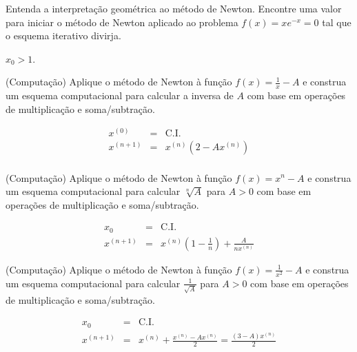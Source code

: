 \begin{exer} Entenda a interpretação geométrica ao método de Newton. Encontre uma valor para iniciar o método de Newton aplicado ao problema $f(x)=xe^{-x}=0$ tal que o esquema iterativo divirja.
\end{exer}
\begin{resp}
  
$x_0>1$.    
  
\end{resp}

\begin{exer}(Computação) Aplique o método de Newton à função $f(x)=\frac{1}{x}-A$ e construa um esquema computacional para calcular a inversa de $A$ com base em operações de multiplicação e soma/subtração.
 \end{exer}
\begin{resp}
  \begin{eqnarray*}
 x^{(0)} &=& \text{C.I.}\\
 x^{(n+1)}&=&x^{(n)}\left(2-Ax^{(n)}\right) \\ 
 \end{eqnarray*}
\end{resp}


\begin{exer}(Computação) Aplique o método de Newton à função $f(x)=x^n-A$ e construa um esquema computacional para calcular  $\sqrt[n]{A}$ para $A>0$ com base em operações de multiplicação e soma/subtração.
\end{exer}
\begin{resp}
 \begin{eqnarray*}
 x_{0} &=& \text{C.I.}\\
 x^{(n+1)}&=&x^{(n)}\left(1-\frac{1}{n}\right) + \frac{A}{n x^{(n)}}
 \end{eqnarray*}

\end{resp}


\begin{exer}(Computação) Aplique o método de Newton à função $f(x)=\frac{1}{x^2}-A$ e construa um esquema computacional para calcular  $\frac{1}{\sqrt{A}}$ para $A>0$ com base em operações de multiplicação e soma/subtração.
\end{exer}
\begin{resp}
 \begin{eqnarray*}
 x_{0} &=& \text{C.I.}\\
 x^{(n+1)}&=&x^{(n)} + \frac{x^{(n)}-Ax^{(n)}}{2}=\frac{(3-A)x^{(n)}}{2}\\ 
 \end{eqnarray*}

\end{resp}




